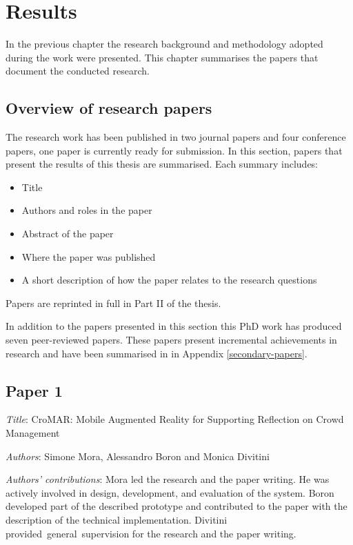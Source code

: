 \chapter{Results}\label{results}


In the previous chapter the research background and methodology adopted during the work were presented. This chapter summarises the papers that document the conducted research.

\section{Overview of research papers}\label{papers}

The research work has been published in two journal papers and four conference papers, one paper is currently ready for submission. In this section, papers that present the results of this thesis are summarised. Each summary includes: 
\begin{itemize}
	\itemsep1pt\parskip0pt 
	\item Title 
	\item Authors and roles in the paper 
	\item Abstract of the paper
	\item Where the paper was published 
	\item A short description of how the paper relates to the research questions
\end{itemize}

Papers are reprinted in full in Part II of the thesis.

In addition to the papers presented in this section this PhD work has produced seven peer-reviewed papers. These papers present incremental achievements in research and have been summarised in in Appendix \ref{secondary-papers}.

\section[P1: CroMAR: Mobile Augmented Reality for Supporting Reflection on Crowd Management][Paper 1]{Paper 1} \label{paper-1}

\emph{Title}: CroMAR: Mobile Augmented Reality for Supporting Reflection on Crowd Management

\emph{Authors}: Simone Mora, Alessandro Boron and Monica Divitini

\emph{Authors' contributions}: Mora led the research and the paper writing. He was actively involved in design, development, and evaluation of the system. Boron developed part of the described prototype and contributed to the paper with the description of the technical implementation. Divitini provided~general~supervision for the research and the paper writing. 

